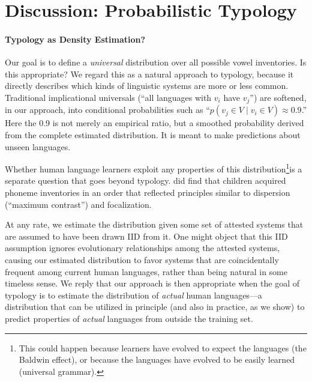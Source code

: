 \documentclass[11pt,a4paper]{article}
\renewcommand{\newcite}[2][]{\citet[#1]{#2}}
\newcommand{\saveforCR}[1]{}
\begin{document}
\saveforCR{\paragraph{Visualization of Perceptual Space.}}

\section{Discussion: Probabilistic Typology}\label{sec:related-work}

\paragraph{Typology as Density Estimation?}
Our goal is to define a {\em universal} distribution over all possible vowel inventories.  Is this appropriate?
We regard this as a natural approach to typology, because it directly describes which kinds of linguistic systems are more or less common.  Traditional implicational universals (``all languages with $v_i$ have $v_j$'') are softened, in our approach, into conditional probabilities such as ``$p(v_j \in V \mid v_i \in V) \approx 0.9$.'' Here the 0.9 is not merely an empirical ratio, but a smoothed probability derived from the complete estimated distribution.  It is meant to make predictions about unseen languages.

Whether human language learners exploit any properties of this distribution\footnote{This could happen because learners have evolved to expect the languages (the Baldwin effect), or because the languages have evolved to be easily learned (universal grammar).}is a separate question that goes beyond typology.  \newcite{jakobson1941kindersprache} did find that children acquired phoneme inventories in an order that reflected principles similar to dispersion (``maximum contrast'') and focalization.

At any rate, we estimate the distribution given some set of attested systems that are assumed to have been drawn IID from it.  One might object that this IID assumption ignores evolutionary relationships among the attested systems, causing our estimated distribution to favor systems that are coincidentally frequent among current human languages, rather than being natural in some timeless sense.  We reply that our approach is then appropriate when the goal of typology is to estimate the distribution of {\em actual} human languages---a distribution that can be utilized in principle (and also in practice, as we show) to predict properties of {\em actual} languages from outside the training set.  
\end{document}
